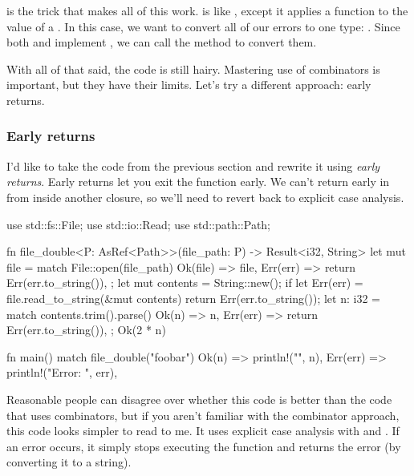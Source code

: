 \blank

 is the trick that makes all of this work.  is like , except it applies a function to 
the  value of a \result. In this case, we want to convert all of our errors to one type: \String. Since both 
 and  implement , we can call the  method to 
convert them.

\blank

With all of that said, the code is still hairy. Mastering use of combinators is important, but they have their limits. 
Let's try a different approach: early returns.

\subsubsection*{Early returns}

I'd like to take the code from the previous section and rewrite it using \emph{early returns}. Early returns let you exit 
the function early. We can't return early in  from inside another closure, so we'll need to revert back 
to explicit case analysis.

\begin{rustc}
use std::fs::File;
use std::io::Read;
use std::path::Path;

fn file_double<P: AsRef<Path>>(file_path: P) -> Result<i32, String> {
    let mut file = match File::open(file_path) {
        Ok(file) => file,
        Err(err) => return Err(err.to_string()),
    };
    let mut contents = String::new();
    if let Err(err) = file.read_to_string(&mut contents) {
        return Err(err.to_string());
    }
    let n: i32 = match contents.trim().parse() {
        Ok(n) => n,
        Err(err) => return Err(err.to_string()),
    };
    Ok(2 * n)
}

fn main() {
    match file_double("foobar") {
        Ok(n) => println!("{}", n),
        Err(err) => println!("Error: {}", err),
    }
}
\end{rustc}

Reasonable people can disagree over whether this code is better than the code that uses combinators, but if you aren't 
familiar with the combinator approach, this code looks simpler to read to me. It uses explicit case analysis with  
and . If an error occurs, it simply stops executing the function and returns the error (by converting it to a 
string).

